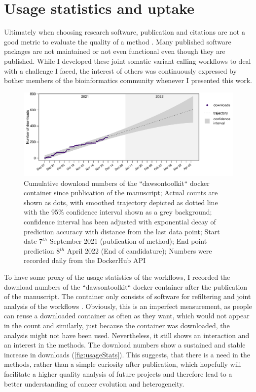 \section[Usage]{Usage statistics and uptake}
\label{variantcalling-sec:usage}
Ultimately when choosing research software, publication and citations are not a good metric to evaluate the quality of a method \cite{Gardner2022}. Many published software packages are not maintained or not even functional even though they are published. While I developed these joint somatic variant calling workflows to deal with a challenge I faced, the interest of others was continuously expressed by bother members of the bioinformatics community whenever I presented this work.

\begin{figure}[!ht]
\centering
\includegraphics[width=.99\linewidth]{Figures/dawsontoolkitDownloads.pdf}
\caption[Usage statistics joint workflows]{Cumulative download numbers of the ``dawsontoolkit`` docker container since publication of the manuscript; Actual counts are shown as dots, with smoothed trajectory depicted as dotted line with the 95\% confidence interval shown as a grey background; confidence interval has been adjusted with exponential decay of prediction accuracy with distance from the last data point; Start date 7$^{th}$ September 2021 (publication of method); End point prediction 8$^{th}$ April 2022 (End of candidature); Numbers were recorded daily from the DockerHub API}\label{fig:usageStats}
\end{figure}

To have some proxy of the usage statistics of the workflows, I recorded the download numbers of the ``dawsontoolkit`` docker container after the publication of the manuscript. The container only consists of software for refiltering and joint analysis of the workflows . Obviously, this is an imperfect measurement, as people can reuse a downloaded container as often as they want, which would not appear in the count and similarly, just because the container was downloaded, the analysis might not have been used. Nevertheless, it still shows  an interaction and an interest in the methods. The download numbers show a sustained and stable increase in downloads (\autoref{fig:usageStats}). This suggests, that there is a need in the methods, rather than a simple curiosity after publication, which hopefully will facilitate a higher quality analysis of future projects and therefore lead to a better understanding of cancer evolution and heterogeneity.
